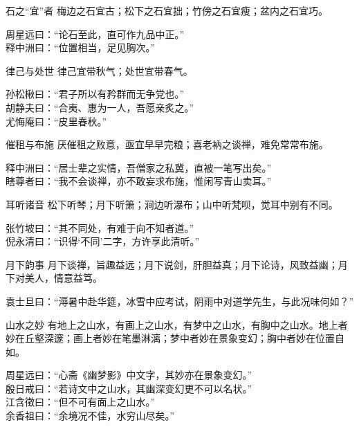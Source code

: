 \begin{yulu}{石之“宜”者}
梅边之石宜古；松下之石宜拙；竹傍之石宜瘦；盆内之石宜巧。
\begin{comments}
周星远曰：“论石至此，直可作九品中正。” \\
释中洲曰：“位置相当，足见胸次。”
\end{comments}
\end{yulu}

\begin{yulu}{律己与处世}
律己宜带秋气；处世宜带春气。
\begin{comments}
孙松楸曰：“君子所以有矜群而无争党也。” \\
胡静夫曰：“合夷、惠为一人，吾愿亲炙之。” \\
尤悔庵曰：“皮里春秋。”
\end{comments}
\end{yulu}

\begin{yulu}{催租与布施}
厌催租之败意，亟宜早早完粮；喜老衲之谈禅，难免常常布施。
\begin{comments}
释中洲曰：“居士辈之实情，吾僧家之私冀，直被一笔写出矣。” \\
瞎尊者曰：“我不会谈禅，亦不敢妄求布施，惟闲写青山卖耳。”
\end{comments}
\end{yulu}

\begin{yulu}{耳听诸音}
松下听琴；月下听箫；涧边听瀑布；山中听梵呗，觉耳中别有不同。
\begin{comments}
张竹坡曰：“其不同处，有难于向不知者道。” \\
倪永清曰：“识得‘不同’二字，方许享此清听。”
\end{comments}
\end{yulu}

\begin{yulu}{月下韵事}
月下谈禅，旨趣益远；月下说剑，肝胆益真；月下论诗，风致益幽；月下对美人，情意益笃。
\begin{comments}
袁士旦曰：“溽暑中赴华筵，冰雪中应考试，阴雨中对道学先生，与此况味何如？”
\end{comments}
\end{yulu}

\begin{yulu}{山水之妙}
有地上之山水，有画上之山水，有梦中之山水，有胸中之山水。地上者妙在丘壑深邃；画上者妙在笔墨淋漓；梦中者妙在景象变幻；胸中者妙在位置自如。
\begin{comments}
周星远曰：“心斋《幽梦影》中文字，其妙亦在景象变幻。” \\
殷日戒曰：“若诗文中之山水，其幽深变幻更不可以名状。” \\
江含徵曰：“但不可有面上之山水。” \\
余香祖曰：“余境况不佳，水穷山尽矣。”
\end{comments}
\end{yulu}

